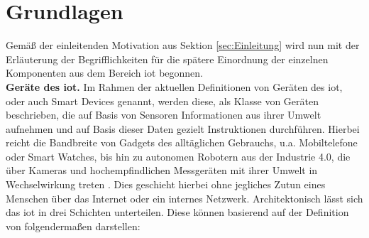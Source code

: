 
\section{Grundlagen}
\label{sec:Grundlagen}

Gemäß der einleitenden Motivation aus Sektion \ref{sec:Einleitung} wird nun mit der Erläuterung der Begrifflichkeiten für die spätere Einordnung der einzelnen Komponenten aus dem Bereich \ac{iot} begonnen.\\



\noindent \textbf{Geräte des \acl{iot}.}
Im Rahmen der aktuellen Definitionen von Geräten des \ac{iot}, oder auch Smart Devices genannt, werden diese, als Klasse von Geräten beschrieben, die auf Basis von Sensoren Informationen aus ihrer Umwelt aufnehmen und auf Basis dieser Daten gezielt Instruktionen durchführen. Hierbei reicht die Bandbreite von Gadgets des alltäglichen Gebrauchs, u.a. Mobiltelefone oder Smart Watches, bis hin zu autonomen Robotern aus der Industrie 4.0, die über Kameras und hochempfindlichen Messgeräten mit ihrer Umwelt in Wechselwirkung treten \cite{Li2015}. Dies geschieht hierbei ohne jegliches Zutun eines Menschen über das Internet oder ein internes Netzwerk. Architektonisch lässt sich das \ac{iot} in drei Schichten unterteilen. Diese können basierend auf der Definition von \cite{Seliem2018} folgendermaßen darstellen:

